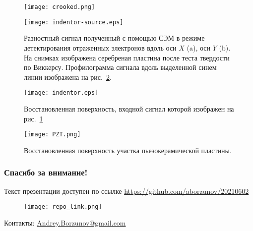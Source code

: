 \documentclass{beamer}
\begin{document}
\begin{frame}[c,allowframebreaks]
\framebreak

    \begin{figure}[ht]
        \texttt{[image: crooked.png]}
    \end{figure}

\framebreak

    \begin{figure}
        \texttt{[image: indentor-source.eps]}
        \caption{Разностный сигнал полученный с помощью СЭМ в режиме детектирования отраженных
            электронов вдоль оси $X$ (a), оси $Y$ (b). На снимках изображена серебреная пластина
            после теста твердости по Виккерсу. Профилограмма сигнала вдоль выделенной синем линии
        изображена на рис.~\ref{fig:indentor}.}%
        \label{fig:indentor-source}
    \end{figure}

\framebreak

    \begin{figure}
        \texttt{[image: indentor.eps]}
        \caption{Восстановленная поверхность, входной сигнал которой изображен на
        рис.~\ref{fig:indentor-source}}
        {\label{fig:indentor}}%
    \end{figure}

\framebreak

    \begin{figure}[ht]
        \texttt{[image: PZT.png]}
        \caption{Восстановленная поверхность участка пьезокерамической пластины.}
    \end{figure}


\end{frame}

\begin{frame}[c,allowframebreaks]
    
\end{frame}

\begin{frame}[c]
    \frametitle{Спасибо за внимание!}
    Текст презентации доступен по ссылке
    \url{https://github.com/aborzunov/20210602}
    \begin{figure}
        \texttt{[image: repo\_link.png]}
    \end{figure}
     Контакты: \url{Andrey.Borzunov@gmail.com}
\end{frame}
\end{document}
